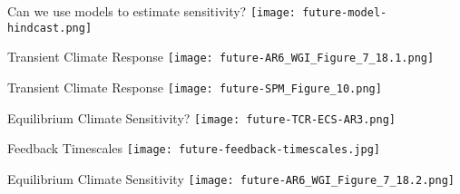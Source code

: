 \documentclass[aspectratio=169]{beamer}
\begin{document}


\begin{frame}{Can we use models to estimate sensitivity?}
    \centering
    \texttt{[image: future-model-hindcast.png]}


\end{frame}

\begin{frame}{Transient Climate Response}
    \centering
    \texttt{[image: future-AR6\_WGI\_Figure\_7\_18.1.png]}
\end{frame}

\begin{frame}{Transient Climate Response}
    \centering
    \texttt{[image: future-SPM\_Figure\_10.png]}
\end{frame}

\begin{frame}{Equilibrium Climate Sensitivity?}
    \centering
    \texttt{[image: future-TCR-ECS-AR3.png]}
\end{frame}

\begin{frame}{Feedback Timescales}
    \centering
    \texttt{[image: future-feedback-timescales.jpg]}
\end{frame}

\begin{frame}{Equilibrium Climate Sensitivity}
    \centering
    \texttt{[image: future-AR6\_WGI\_Figure\_7\_18.2.png]}
\end{frame}
\end{document}

